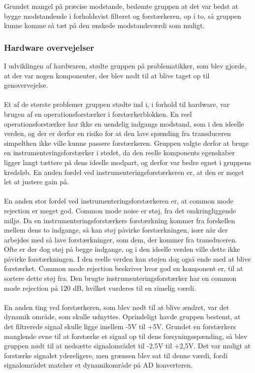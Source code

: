 Grundet mangel på præcise modstande, bedømte gruppen at det var bedst at bygge modstandende i forholdsvist filteret og forstærkeren, op i to, så gruppen kunne komme så tæt på den ønskede modstandsværdi som muligt. \\

\subsubsection{Hardware overvejelser}

I udviklingen af hardwaren, stødte gruppen på problematikker, som blev gjorde, at der var nogen komponenter, der blev nødt til at blive taget op til genovervejelse.\\
\\
Et af de største problemer gruppen stødte ind i, i forhold til hardware, var brugen af en operationsforstærker i forstærkerblokken. En reel operationsforstærker har ikke en uendelig indgangs modstand, som i den ideelle verden, og der er derfor en risiko for at den lave spænding fra transduceren simpelthen ikke ville kunne passere forstærkeren. Gruppen valgte derfor at bruge en instrumenteringsforstærker i stedet, da den reelle komponents egenskaber ligger langt tættere på dens ideelle modpart, og derfor var bedre egnet i gruppens kredsløb. En anden fordel ved instrumenteringsforstærkeren er, at den er meget let at justere gain på.\\
\\
En anden stor fordel ved instrumenteringsforstærkeren er, at common mode rejection er meget god. Common mode noise er støj, fra det omkringliggende miljø. Da en instrumenteringsforstærkers forstærkning kommer fra forskellen mellem dens to indgange, så kan støj påvirke forstærkningen, især når der arbejdes med så lave forstærkninger, som dem, der kommer fra transduceren. Ofte er der dog støj på begge indgange, og i den ideelle verden ville dette ikke påvirke forstærkningen. I den reelle verden kan støjen dog også ende med at blive forstærket. Common mode rejection beskriver hvor god en komponent er, til at sortere dette støj fra. Den brugte instrumenteringsforstærker har en common mode rejection på 120 dB, hvilket vurderes til en rimelig værdi. \\
\\
En anden ting ved forstærkeren, som blev nødt til at blive ændret, var det dynamik område, som skulle udnyttes. Oprindeligt havde gruppen bestemt, at det filtrerede signal skulle ligge imellem -5V til +5V. Grundet en forstærkers manglende evne til at forstærke et signal op til dens forsyningsspænding, så blev gruppen nødt til at nedsætte signalområdet til -2,5V til +2,5V. Det var muligt at forstærke signalet ydereligere, men grænsen blev sat til denne værdi, fordi signalområdet matcher et dynamikområde på AD konverteren.\\ 
